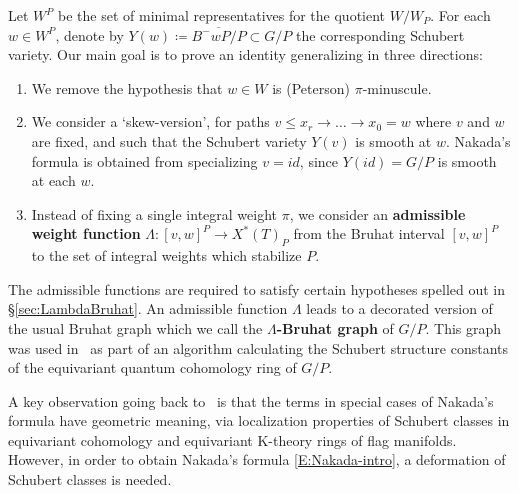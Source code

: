 \documentclass[11pt]{article}
\theoremstyle{definition}
\numberwithin{equation}{section}
\begin{document}
Let $W^P$ be the set of minimal representatives for the quotient $W/W_P$. 
For each $w \in W^P$, denote by 
$Y(w)\coloneqq \overline{B^-w P/P} \subset G/P$ the corresponding Schubert variety.  
Our main goal is to prove an identity generalizing  in three directions:
\begin{enumerate}
	\item We remove the hypothesis that $w \in W$ is (Peterson) $\pi$-minuscule.
	\item We consider a `skew-version', for paths $v \le x_r \to \ldots \to x_0 = w$ where $v$ and $w$ are fixed, and such that 
	the Schubert variety $Y(v)$ is smooth at $w$. Nakada's formula is obtained from specializing $v=id$, 
	since $Y(id) = G/P$ is smooth at each $w$.
	\item Instead of fixing a single integral weight $\pi$, we consider an {\bf admissible weight function}
	$\Lambda: [v,w]^P \to {X^*(T)_P}$ from the Bruhat interval $[v,w]^P$ to the set of integral weights which stabilize $P$.
\end{enumerate}
The admissible functions are required to satisfy certain hypotheses spelled out in \S\ref{sec:LambdaBruhat}. 
An admissible function $\Lambda$ leads to a 
decorated version of the usual Bruhat graph which we call the {\bf $\Lambda$-Bruhat graph} of $G/P$.
This graph was used in~\cite{mihalcea:eqqgr,mihalcea:eqqhom} as part of an algorithm calculating the Schubert structure constants of the equivariant quantum cohomology ring of $G/P$.

A key observation going back to~\cite{mihalcea:eqqhom,naruse2014schubert,naruse2019skew} 
	is that the terms in special cases of Nakada's formula have geometric meaning, via
	localization properties of Schubert classes in equivariant cohomology
	and equivariant K-theory rings of flag manifolds. However, in order to obtain
	Nakada's formula \eqref{E:Nakada-intro}, a deformation of Schubert classes is needed.
\end{document}
